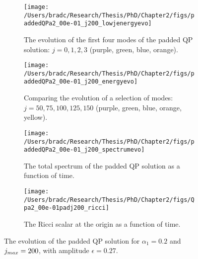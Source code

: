 \documentclass[../PhD.tex]{subfiles}
\begin{document}
\begin{figure}[h]
	\centering
	\begin{subfigure}[t]{0.45\textwidth}
		\texttt{[image: /Users/bradc/Research/Thesis/PhD/Chapter2/figs/paddedQPa2\_00e-01\_j200\_lowjenergyevo]}
		\caption{The evolution of the first four modes of the padded QP solution: {$j=0,1,2,3$} (purple, green, blue, orange).}
	\end{subfigure}
	\;
	\begin{subfigure}[t]{0.45\textwidth}
		\texttt{[image: /Users/bradc/Research/Thesis/PhD/Chapter2/figs/paddedQPa2\_00e-01\_j200\_energyevo]}
		\caption{Comparing the evolution of a selection of modes: {$j= 50, 75, 100, 125, 150$} (purple, green, blue, orange, yellow).}
	\end{subfigure}
	\;
	\begin{subfigure}[t]{0.45\textwidth}
		\texttt{[image: /Users/bradc/Research/Thesis/PhD/Chapter2/figs/paddedQPa2\_00e-01\_j200\_spectrumevo]}
		\caption{The total spectrum of the padded QP solution as a function of time.}
		\label{fig: paddedqp_fullspecevo}
	\end{subfigure}
	\;
	\begin{subfigure}[t]{0.45\textwidth}
		\texttt{[image: /Users/bradc/Research/Thesis/PhD/Chapter2/figs/Qpa2\_00e-01padj200\_ricci]}
		\caption{The Ricci scalar at the origin as a function of time.}
		\label{fig: Qpa2_00e-01padj200_ricci}
	\end{subfigure}
	\caption[The evolution of a padded QP solution]{The evolution of the padded QP solution for $\alpha_1 =0.2$ and $j_{max} = 200$, with amplitude $\epsilon=0.27$.}
	\label{fig:paddedqpevo}
\end{figure}

\end{document}
